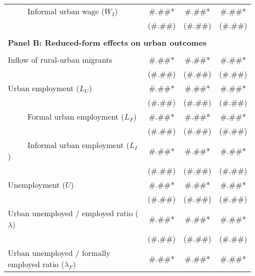 \begin{tabular}{lrrr}
~~~~~Informal urban wage ($W_{I}$) & \multicolumn{1}{c}{\#.\#\#*} & \multicolumn{1}{c}{\#.\#\#*} & \multicolumn{1}{c}{\#.\#\#*} \\
      & \multicolumn{1}{c}{(\#.\#\#)} & \multicolumn{1}{c}{(\#.\#\#)} & \multicolumn{1}{c}{(\#.\#\#)} \\
      &       &       &  \\
\multicolumn{4}{l}{\textbf{Panel B: Reduced-form effects on urban outcomes}} \\
      &       &       &  \\
Inflow of rural-urban migrants & \multicolumn{1}{c}{\#.\#\#*} & \multicolumn{1}{c}{\#.\#\#*} & \multicolumn{1}{c}{\#.\#\#*} \\
      & \multicolumn{1}{c}{(\#.\#\#)} & \multicolumn{1}{c}{(\#.\#\#)} & \multicolumn{1}{c}{(\#.\#\#)} \\
Urban employment ($L_{U}$) & \multicolumn{1}{c}{\#.\#\#*} & \multicolumn{1}{c}{\#.\#\#*} & \multicolumn{1}{c}{\#.\#\#*} \\
      & \multicolumn{1}{c}{(\#.\#\#)} & \multicolumn{1}{c}{(\#.\#\#)} & \multicolumn{1}{c}{(\#.\#\#)} \\
~~~~~Formal urban employment ($L_{F}$) & \multicolumn{1}{c}{\#.\#\#*} & \multicolumn{1}{c}{\#.\#\#*} & \multicolumn{1}{c}{\#.\#\#*} \\
      & \multicolumn{1}{c}{(\#.\#\#)} & \multicolumn{1}{c}{(\#.\#\#)} & \multicolumn{1}{c}{(\#.\#\#)} \\
~~~~~Informal urban employment ($L_{I}$) & \multicolumn{1}{c}{\#.\#\#*} & \multicolumn{1}{c}{\#.\#\#*} & \multicolumn{1}{c}{\#.\#\#*} \\
      & \multicolumn{1}{c}{(\#.\#\#)} & \multicolumn{1}{c}{(\#.\#\#)} & \multicolumn{1}{c}{(\#.\#\#)} \\
Unemployment ($U$) & \multicolumn{1}{c}{\#.\#\#*} & \multicolumn{1}{c}{\#.\#\#*} & \multicolumn{1}{c}{\#.\#\#*} \\
      & \multicolumn{1}{c}{(\#.\#\#)} & \multicolumn{1}{c}{(\#.\#\#)} & \multicolumn{1}{c}{(\#.\#\#)} \\
Urban unemployed / employed ratio ($\lambda$) & \multicolumn{1}{c}{\#.\#\#*} & \multicolumn{1}{c}{\#.\#\#*} & \multicolumn{1}{c}{\#.\#\#*} \\
      & \multicolumn{1}{c}{(\#.\#\#)} & \multicolumn{1}{c}{(\#.\#\#)} & \multicolumn{1}{c}{(\#.\#\#)} \\
Urban unemployed / formally employed ratio ($\lambda_{F}$) & \multicolumn{1}{c}{\#.\#\#*} & \multicolumn{1}{c}{\#.\#\#*} & \multicolumn{1}{c}{\#.\#\#*} \\

\end{tabular}
